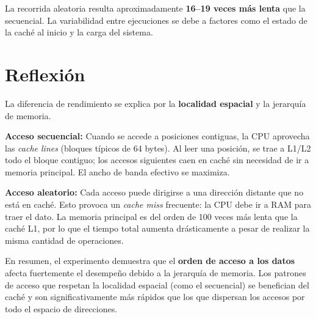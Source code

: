 \documentclass[11pt,a4paper]{article}
\begin{document}
La recorrida aleatoria resulta aproximadamente \textbf{16--19 veces más lenta} que la secuencial. La variabilidad entre ejecuciones se debe a factores como el estado de la caché al inicio y la carga del sistema.

\section{Reflexión}

La diferencia de rendimiento se explica por la \textbf{localidad espacial} y la jerarquía de memoria.

\textbf{Acceso secuencial:} Cuando se accede a posiciones contiguas, la CPU aprovecha las \emph{cache lines} (bloques típicos de 64 bytes). Al leer una posición, se trae a L1/L2 todo el bloque contiguo; los accesos siguientes caen en caché sin necesidad de ir a memoria principal. El ancho de banda efectivo se maximiza.

\textbf{Acceso aleatorio:} Cada acceso puede dirigirse a una dirección distante que no está en caché. Esto provoca un \emph{cache miss} frecuente: la CPU debe ir a RAM para traer el dato. La memoria principal es del orden de 100 veces más lenta que la caché L1, por lo que el tiempo total aumenta drásticamente a pesar de realizar la misma cantidad de operaciones.

En resumen, el experimento demuestra que el \textbf{orden de acceso a los datos} afecta fuertemente el desempeño debido a la jerarquía de memoria. Los patrones de acceso que respetan la localidad espacial (como el secuencial) se benefician del caché y son significativamente más rápidos que los que dispersan los accesos por todo el espacio de direcciones.
\end{document}

